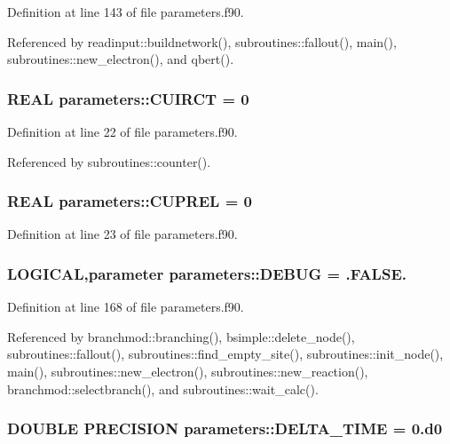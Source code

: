 Definition at line 143 of file parameters.f90.

Referenced by readinput::buildnetwork(), subroutines::fallout(), main(), subroutines::new\_\-electron(), and qbert().\hypertarget{namespaceparameters_a2855e0778fdd644c62b1a6943a4c363a}{
\subsubsection[{CUIRCT}]{\setlength{\rightskip}{0pt plus 5cm}REAL {\bf parameters::CUIRCT} = 0}}
\label{namespaceparameters_a2855e0778fdd644c62b1a6943a4c363a}


Definition at line 22 of file parameters.f90.

Referenced by subroutines::counter().\hypertarget{namespaceparameters_a170cb61fd1eef5175a5eaf95d0d85ab5}{
\subsubsection[{CUPREL}]{\setlength{\rightskip}{0pt plus 5cm}REAL {\bf parameters::CUPREL} = 0}}
\label{namespaceparameters_a170cb61fd1eef5175a5eaf95d0d85ab5}


Definition at line 23 of file parameters.f90.\hypertarget{namespaceparameters_a555f6d9a3fe1c11f68f18ddeb2111ffa}{
\subsubsection[{DEBUG}]{\setlength{\rightskip}{0pt plus 5cm}LOGICAL,parameter {\bf parameters::DEBUG} = .FALSE.}}
\label{namespaceparameters_a555f6d9a3fe1c11f68f18ddeb2111ffa}


Definition at line 168 of file parameters.f90.

Referenced by branchmod::branching(), bsimple::delete\_\-node(), subroutines::fallout(), subroutines::find\_\-empty\_\-site(), subroutines::init\_\-node(), main(), subroutines::new\_\-electron(), subroutines::new\_\-reaction(), branchmod::selectbranch(), and subroutines::wait\_\-calc().\hypertarget{namespaceparameters_a4555e2bb5c9af40a5e98df4f354ac27f}{
\subsubsection[{DELTA\_\-TIME}]{\setlength{\rightskip}{0pt plus 5cm}DOUBLE PRECISION {\bf parameters::DELTA\_\-TIME} = 0.d0}}
\label{namespaceparameters_a4555e2bb5c9af40a5e98df4f354ac27f}


